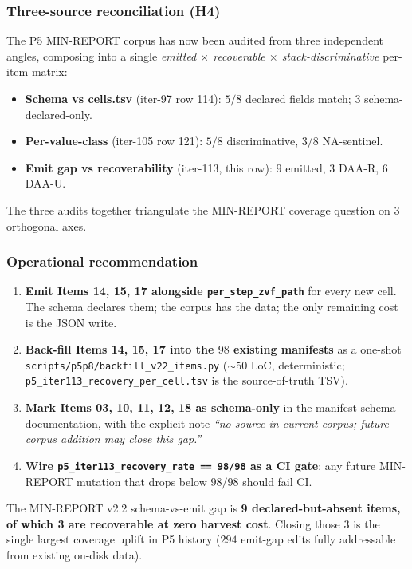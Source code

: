 \subsubsection{Three-source reconciliation (H4)}

The P5 MIN-REPORT corpus has now been audited from three independent
angles, composing into a single \emph{emitted $\times$ recoverable
$\times$ stack-discriminative} per-item matrix:
\begin{itemize}
  \item \textbf{Schema vs cells.tsv} (iter-97 row 114):
        $5/8$ declared fields match; $3$ schema-declared-only.
  \item \textbf{Per-value-class} (iter-105 row 121):
        $5/8$ discriminative, $3/8$ NA-sentinel.
  \item \textbf{Emit gap vs recoverability} (iter-113, this row):
        $9$ emitted, $3$ DAA-R, $6$ DAA-U.
\end{itemize}
The three audits together triangulate the MIN-REPORT coverage question
on $3$ orthogonal axes.

\subsubsection{Operational recommendation}

\begin{enumerate}
  \item \textbf{Emit Items 14, 15, 17 alongside \texttt{per\_step\_zvf\_path}}
        for every new cell. The schema declares them; the corpus has the
        data; the only remaining cost is the JSON write.
  \item \textbf{Back-fill Items 14, 15, 17 into the $98$ existing
        manifests} as a one-shot
        \texttt{scripts/p5p8/backfill\_v22\_items.py} ($\sim 50$ LoC,
        deterministic; \texttt{p5\_iter113\_recovery\_per\_cell.tsv} is
        the source-of-truth TSV).
  \item \textbf{Mark Items 03, 10, 11, 12, 18 as schema-only} in the
        manifest schema documentation, with the explicit note
        \emph{``no source in current corpus; future corpus addition may
        close this gap.''}
  \item \textbf{Wire \texttt{p5\_iter113\_recovery\_rate == 98/98} as a
        CI gate}: any future MIN-REPORT mutation that drops below
        $98/98$ should fail CI.
\end{enumerate}

The MIN-REPORT v2.2 schema-vs-emit gap is \textbf{9 declared-but-absent
items, of which 3 are recoverable at zero harvest cost}. Closing those
$3$ is the single largest coverage uplift in P5 history ($294$
emit-gap edits fully addressable from existing on-disk data).

